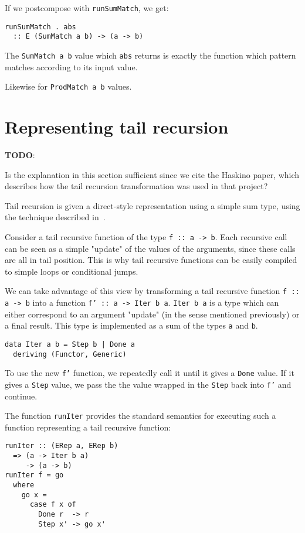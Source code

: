 \documentclass[sigplan,anonymous,review]{acmart}
\newcommand{\ttt}{\texttt}
\newenvironment{todo}
  {\begin{tcolorbox}
   \textbf{TODO}:
  }
  {\end{tcolorbox}
  }
\begin{document}
If we postcompose with \ttt{runSumMatch}, we get:

\begin{lstlisting}
runSumMatch . abs
  :: E (SumMatch a b) -> (a -> b)
\end{lstlisting}

The \ttt{SumMatch a b} value which \ttt{abs} returns is exactly the function
which pattern matches according to its input value.

Likewise for \ttt{ProdMatch a b} values.

\section{Representing tail recursion}
\begin{todo}
  Is the explanation in this section sufficient since we cite the Haskino paper,
  which describes how the tail recursion transformation was used in that project?
\end{todo}

Tail recursion is given a direct-style representation using a simple sum type,
using the technique described in~\cite{Grebe:2017:RSD:3136040.3136048}.

Consider a tail recursive function of the type \ttt{f :: a -> b}. Each recursive
call can be seen as a simple "update" of the values of the arguments, since
these calls are all in tail position. This is why tail recursive functions
can be easily compiled to simple loops or conditional jumps.

We can take advantage of this view by transforming a tail recursive function
\ttt{f :: a -> b} into a function \ttt{f' :: a -> Iter b a}. \ttt{Iter b a} is a
type which can either correspond to an argument "update" (in the sense mentioned
previously) or a final result. This type is implemented as a sum of the types
\ttt{a} and \ttt{b}.

\begin{lstlisting}
data Iter a b = Step b | Done a
  deriving (Functor, Generic)
\end{lstlisting}

To use the new \ttt{f'} function, we repeatedly call it until it gives a
\ttt{Done} value. If it gives a \ttt{Step} value, we pass the the value wrapped
in the \ttt{Step} back into \ttt{f'} and continue.

The function \ttt{runIter} provides the standard semantics for executing such a
function representing a tail recursive function:

\begin{lstlisting}
runIter :: (ERep a, ERep b)
  => (a -> Iter b a)
     -> (a -> b)
runIter f = go
  where
    go x =
      case f x of
        Done r  -> r
        Step x' -> go x'
\end{lstlisting}
\end{document}
